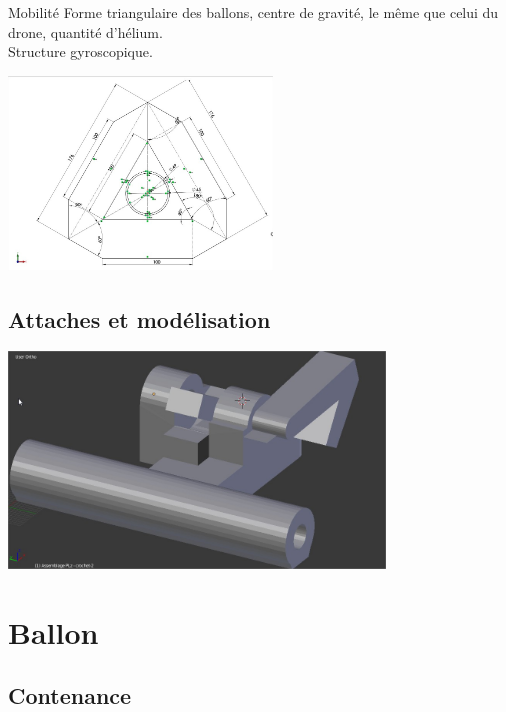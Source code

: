 \documentclass{beamer}
\begin{document}
\begin{frame}{Mobilité}
  Forme triangulaire des ballons, centre de gravité, le même que celui du drone, quantité d'hélium. \\
  Structure gyroscopique.
  \begin{center}
    \includegraphics[width=7cm]{../Images/plan_structure.jpg}
  \end{center}
\end{frame}

\subsection{Attaches et modélisation}

\begin{frame}
  \begin{center}
    \includegraphics[width=10cm]{../Images/fixation.jpg}
  \end{center}
\end{frame}

\section{Ballon}

\subsection{Contenance}
\end{document}
